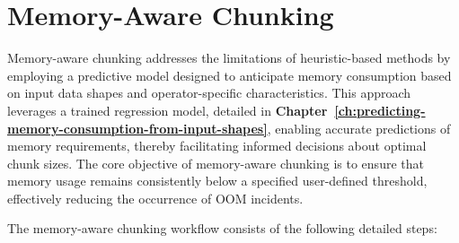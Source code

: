 \section{Memory-Aware Chunking}
\label{sec:idp-memory-aware-chunking}

Memory-aware chunking addresses the limitations of heuristic-based methods by employing a predictive model designed to anticipate memory consumption based on input data shapes and operator-specific characteristics.
This approach leverages a trained regression model, detailed in \textbf{Chapter~\ref{ch:predicting-memory-consumption-from-input-shapes}}, enabling accurate predictions of memory requirements, thereby facilitating informed decisions about optimal chunk sizes.
The core objective of memory-aware chunking is to ensure that memory usage remains consistently below a specified user-defined threshold, effectively reducing the occurrence of \ac{OOM} incidents.

The memory-aware chunking workflow consists of the following detailed steps:

